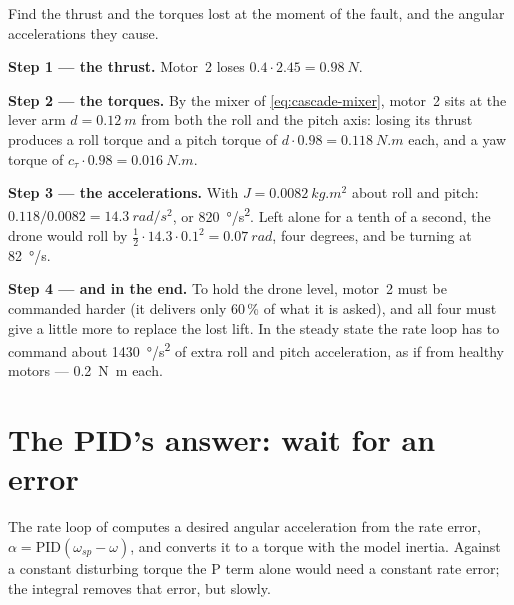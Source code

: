 \begin{example}
\label{ex:indi-fault}
Find the thrust and the torques lost at the moment of the fault, and the angular accelerations they cause.

\textbf{Step 1 — the thrust.} Motor~2 loses $0.4 \cdot 2.45 = \SI{0.98}{N}$.

\textbf{Step 2 — the torques.} By the mixer of \cref{eq:cascade-mixer}, motor~2 sits at the lever arm $d = \SI{0.12}{m}$ from both the roll and the pitch axis: losing its thrust produces a roll torque and a pitch torque of $d \cdot 0.98 = \SI{0.118}{N.m}$ each, and a yaw torque of $c_\tau \cdot 0.98 = \SI{0.016}{N.m}$.

\textbf{Step 3 — the accelerations.} With $J = \SI{0.0082}{kg.m^2}$ about roll and pitch: $0.118/0.0082 = \SI{14.3}{rad/s^2}$, or \SI{820}{\degree/s^2}. Left alone for a tenth of a second, the drone would roll by $\tfrac12 \cdot 14.3 \cdot 0.1^2 = \SI{0.07}{rad}$, four degrees, and be turning at \SI{82}{\degree/s}.

\textbf{Step 4 — and in the end.} To hold the drone level, motor~2 must be commanded harder (it delivers only 60\,\% of what it is asked), and all four must give a little more to replace the lost lift. In the steady state the rate loop has to command about \SI{1430}{\degree/s^2} of extra roll and pitch acceleration, as if from healthy motors — \SI{0.2}{N.m} each.
\end{example}

\section{The PID's answer: wait for an error}

The rate loop of  computes a desired angular acceleration from the rate error, $\alpha = \mathrm{PID}(\omega_{sp} - \omega)$, and converts it to a torque with the model inertia. Against a constant disturbing torque the P term alone would need a constant rate error; the integral removes that error, but slowly.

